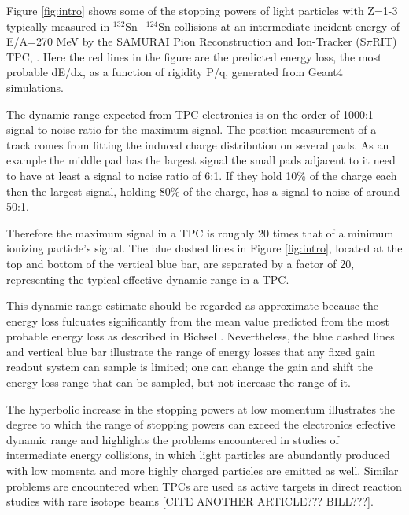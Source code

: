 \documentclass[review]{elsarticle}
\begin{document}
Figure \ref{fig:intro} shows some of the stopping powers of light particles with Z=1-3 typically measured in ${}^{132}$Sn+${}^{124}$Sn collisions at an intermediate incident energy of E/A=270 MeV by the SAMURAI Pion Reconstruction and Ion-Tracker (S$\pi$RIT) TPC, \cite{shane}. Here the red lines in the figure are the predicted energy loss, the most probable dE/dx, as a function of rigidity P/q, generated from Geant4 simulations. 

The dynamic range expected from TPC electronics is on the order of 1000:1 signal to noise ratio for the maximum signal. The position measurement of a track comes from fitting the induced charge distribution on several pads. As an example the middle pad has the largest signal  the small pads adjacent to it need to have at least a signal to noise ratio of 6:1. If they hold  10\% of the charge each then the largest signal, holding 80\% of the charge, has a signal to noise of around 50:1. 

 Therefore the maximum signal in a TPC is roughly 20 times that of a minimum ionizing particle's signal. The blue dashed lines in Figure \ref{fig:intro}, located at the top and bottom of the vertical blue bar, are separated by a factor of 20, representing the typical effective dynamic range in a TPC. 

This dynamic range estimate should be regarded as approximate because the energy loss fulcuates significantly from the mean value predicted from the most probable energy loss as described in Bichsel \cite{bichsel}. Nevertheless, the blue dashed lines and vertical blue bar illustrate the range of energy losses that any fixed gain readout system can sample is limited; one can change the gain and shift the energy loss range that can be sampled, but not increase the range of it. 


The hyperbolic increase in the stopping powers at low momentum illustrates the degree to which the range of stopping powers can exceed the electronics effective dynamic range and highlights the problems encountered in studies of intermediate energy collisions, in which light particles are abundantly produced with low momenta and more highly charged particles are emitted as well. Similar problems are encountered when TPCs are used as active targets in direct reaction studies with rare isotope beams \cite{pattpc} [CITE ANOTHER ARTICLE??? BILL???]. 
\end{document}
